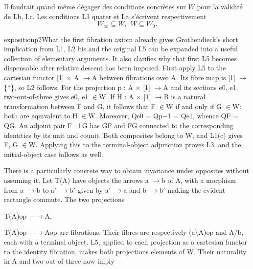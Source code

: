 \clearpage

\noindent{}
Il faudrait quand même dégager des conditions concrètes sur $W$ pour la validité de Lb, Lc. Les conditions L3 quater et La s'écrivent respectivement
\[
W_\infty \subseteq W,\ \ W \subseteq W_0.
\]

\noindent{}

\begin{dcomment}{exposition}{p2}{What the first fibration axiom already gives}
Grothendieck’s short implication from L1, L2 bis and the original L5 can be expanded into a useful collection of elementary arguments. It also clarifies why that first L5 becomes dispensable after relative descent has been imposed. First apply L5 to the cartesian functor [1] \ensuremath{\times} A \ensuremath{\to}A between fibrations over A. Its fibre map is [1] \ensuremath{\to}\{\ensuremath{*}\}, so L2 follows. For the projection p : A \ensuremath{\times} [1] \ensuremath{\to}A and its sections e0, e1, two-out-of-three gives e0, e1 \ensuremath{\in}W. If H : A \ensuremath{\times} [1] \ensuremath{\to}B is a natural transformation between F and G, it follows that F \ensuremath{\in}W if and only if G \ensuremath{\in}W: both are equivalent to H \ensuremath{\in}W. Moreover, Qe0 = Qp\ensuremath{-}1 = Qe1, whence QF = QG. An adjoint pair F \ensuremath{\dashv}G has GF and FG connected to the corresponding identities by its unit and counit. Both composites belong to W, and L1(c) gives F, G \ensuremath{\in}W. Applying this to the terminal-object adjunction proves L3, and the initial-object case follows as well.

There is a particularly concrete way to obtain invariance under opposites without assuming it. Let T(A) have objects the arrows a \ensuremath{\to}b of A, with a morphism from a \ensuremath{\to}b to a\ensuremath{\prime} \ensuremath{\to}b\ensuremath{\prime} given by a\ensuremath{\prime} \ensuremath{\to}a and b \ensuremath{\to}b\ensuremath{\prime} making the evident rectangle commute. The two projections

T(A)op \ensuremath{-}\ensuremath{\to}A,

T(A)op \ensuremath{-}\ensuremath{\to}Aop are fibrations. Their fibres are respectively (a\textbackslash{}A)op and A/b, each with a terminal object. L5, applied to each projection as a cartesian functor to the identity fibration, makes both projections elements of W. Their naturality in A and two-out-of-three now imply


\end{dcomment}
